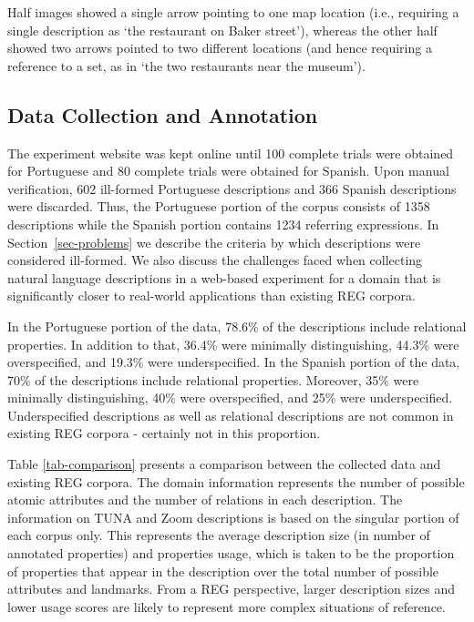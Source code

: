 \documentclass{article}
\begin{document}
Half images showed a single arrow pointing to one map location (i.e., requiring a single description as `the restaurant on Baker street'), whereas the other half showed two arrows pointed to two different locations (and hence requiring a reference to a set, as in `the two restaurants near the museum'). 


\subsection{Data Collection and Annotation}
\label{sec-annotation}

The experiment website was kept online until 100 complete trials were obtained for Portuguese and 80 complete trials were obtained for Spanish. Upon manual verification, 602 ill-formed Portuguese descriptions and 366 Spanish descriptions were discarded. Thus, the Portuguese portion of the corpus consists of 1358 descriptions while the Spanish portion contains 1234 referring expressions. In Section~\ref{sec-problems} we describe the criteria by which descriptions were considered ill-formed. We also discuss the challenges faced when collecting natural language descriptions in a web-based experiment for a domain that is significantly closer to real-world applications than existing REG corpora. 

In the Portuguese portion of the data, 78.6\% of the descriptions include relational properties. In addition to that, 36.4\% were minimally distinguishing, 44.3\% were overspecified, and  19.3\% were underspecified. In the Spanish portion of the data, 70\% of the descriptions include relational properties. Moreover, 35\% were minimally distinguishing, 40\% were overspecified, and 25\% were underspecified. Underspecified descriptions as well as relational descriptions are not common in existing REG corpora - certainly not in this proportion.  

Table \ref{tab-comparison} presents a comparison between the collected data and existing REG corpora. The domain information represents the number of possible atomic attributes and the number of relations in each description. The information on TUNA and Zoom descriptions is based on the singular portion of each corpus only. This represents the average description size (in number of annotated properties) and properties usage, which is taken to be  the proportion of properties that appear in the description over the total number of possible attributes and landmarks. From a REG perspective, larger description sizes and lower usage scores are likely to represent more complex situations of reference.
\end{document}
